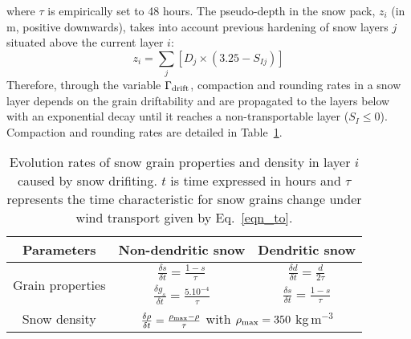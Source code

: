 %
where $\tau$ is empirically set to 48 hours. The pseudo-depth in the
snow pack, $z_i$ (in m, positive downwards), takes into account
previous hardening of snow layers $j$ situated above the current layer
$i$: 
%
\begin{equation}
z_i = \sum_j \left[ D_j \times \left(3.25-S_{Ij} \right) \right]  
\end{equation}
%
Therefore, through the
variable $\Gamma_{\rm drift}$, compaction and rounding rates in a snow
layer depends on the grain driftability and are propagated to the
layers below with an exponential decay until it reaches a
non-transportable layer ($S_I\le$0). Compaction and rounding rates are
detailed in Table~\ref{tab_evol_drift}.



\begin{table}[t]
\caption{Evolution rates of snow grain properties and density in layer
  $i$ caused by snow drifiting. $t$ is time expressed in hours and
  $\tau$ represents the time characteristic for snow grains change
  under wind transport given by Eq.~\ref{eqn_to}.}  
\vskip4mm
\centering
\begin{tabular}{c|c|c}
\hline
Parameters&Non-dendritic snow &Dendritic snow \\
\hline
\multirow{2}{*}{Grain properties} & $\frac{\delta s}{\delta t} = \frac{1-s}{\tau}$  & $\frac{\delta d}{\delta t} = \frac{d}{2\tau}$ \\
& $\frac{\delta g_s}{\delta t} = \frac{5.10^{-4}}{\tau} $ & $\frac{\delta s}{\delta t} = \frac{1-s}{\tau}$\\
\hline
Snow density &    \multicolumn{2}{c}{ $\frac{\delta \rho}{\delta t} =\frac{\rho_{\rm max}-\rho}{\tau}$ with $\rho_{\rm max} =350$ kg\,m$^{-3}$ }\\
\hline
\end{tabular}
\label{tab_evol_drift}
\end{table}

